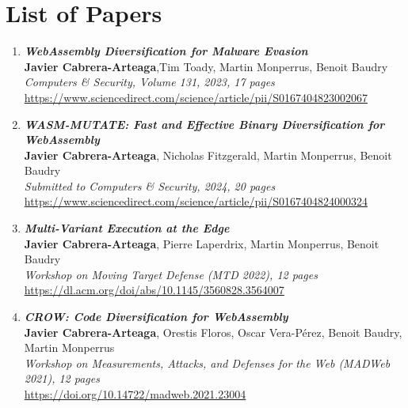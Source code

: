 
\chapter{List of Papers}
\vspace{-0.5cm}
\vspace{1cm}
\begin{enumerate}[I]
    \item \textbf{\textit{WebAssembly Diversification for Malware Evasion}} \\
        \textbf{Javier Cabrera-Arteaga},Tim Toady, Martin Monperrus, Benoit Baudry\\
        \textit{Computers \& Security, Volume 131, 2023, 17 pages} \\
        \url{https://www.sciencedirect.com/science/article/pii/S0167404823002067}
    \item \textbf{\textit{WASM-MUTATE: Fast and Effective Binary Diversification for
    WebAssembly}} \\
        \textbf{Javier Cabrera-Arteaga}, Nicholas Fitzgerald, Martin Monperrus, Benoit Baudry\\
        \textit{Submitted to Computers \& Security, 2024, 20 pages} \\
        \url{https://www.sciencedirect.com/science/article/pii/S0167404824000324}    
    \item \textbf{\textit{Multi-Variant Execution at the Edge}} \\
    \textbf{Javier Cabrera-Arteaga}, Pierre Laperdrix, Martin Monperrus, Benoit Baudry\\
    \textit{Workshop on Moving Target Defense (MTD 2022), 12 pages} \\
    \url{https://dl.acm.org/doi/abs/10.1145/3560828.3564007}

    \item \textbf{\textit{CROW: Code Diversification for WebAssembly}} \\
        \textbf{Javier Cabrera-Arteaga}, Orestis Floros, Oscar Vera-Pérez, Benoit Baudry, Martin Monperrus\\
        \textit{ Workshop on Measurements, Attacks, and Defenses for the Web (MADWeb 2021), 12 pages} \\
        \url{https://doi.org/10.14722/madweb.2021.23004}
    

\end{enumerate}
